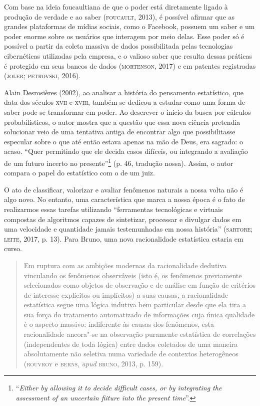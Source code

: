 Com base na ideia foucaultiana de que o poder está diretamente ligado à
produção de verdade e ao saber (\textsc{foucault}, 2013),
é possível afirmar que as grandes plataformas de mídias sociais, como o
Facebook, possuem um saber e um poder enorme sobre os usuários que
interagem por meio delas. Esse poder só é possível a partir da coleta
massiva de dados possibilitada pelas tecnologias cibernéticas utilizadas
pela empresa, e o valioso saber que resulta dessas práticas é protegido
em seus bancos de dados (\textsc{mortenson}, 2017) e em patentes registradas
(\textsc{joler}; \textsc{petrovski}, 2016).

Alain Desrosières (2002), ao analisar a história do pensamento estatístico, que data dos séculos
\textsc{xvii} e \textsc{xviii}, também se dedicou a estudar como uma forma de saber pode
se transformar em poder. Ao descrever o início da busca por cálculos
probabilísticos, o autor mostra que a questão que essa nova ciência
pretendia solucionar veio de uma tentativa antiga de encontrar algo que
possibilitasse especular sobre o que até então estava apenas na mão de
Deus, era sagrado: o acaso. ``Quer permitindo que ele decida casos
difíceis, ou integrando a avaliação de um futuro incerto no
presente''\footnote{``\emph{Either by allowing it to decide difficult cases,
  or by integrating the assessment of an uncertain fiiture into the
  present time}''.} (p. 46, tradução nossa). Assim, o autor compara o papel
do estatístico com o de um juiz.

O ato de classificar, valorizar e avaliar fenômenos naturais a nossa
volta não é algo novo. No entanto, uma característica que marca a nossa
época é o fato de realizarmos essas tarefas utilizando ``ferramentas
tecnológicas e virtuais compostas de algoritmos capazes de sintetizar,
processar e divulgar dados em uma velocidade e quantidade jamais
testemunhadas em nossa história'' (\textsc{sartore}; \textsc{leite}, 2017, p. 13). Para Bruno, uma nova racionalidade estatística estaria em curso.

\begin{quote}
Em ruptura com as ambições modernas da racionalidade dedutiva vinculando
os fenômenos observáveis (isto é, os fenômenos previamente selecionados
como objetos de observação e de análise em função de critérios de
interesse explícitos ou implícitos) a suas causas, a racionalidade
estatística segue uma lógica indutiva bem particular desde que ela tira
a sua força do tratamento automatizado de informações cuja única
qualidade é o aspecto massivo: indiferente às causas dos fenômenos, esta
racionalidade ancora"-se na observação puramente estatística de
correlações (independentes de toda lógica) entre dados coletados de uma
maneira absolutamente não seletiva numa variedade de contextos
heterogêneos (\textsc{rouvroy} e \textsc{berns}, \emph{apud} \textsc{bruno}, 2013, p. 159).
\end{quote}

